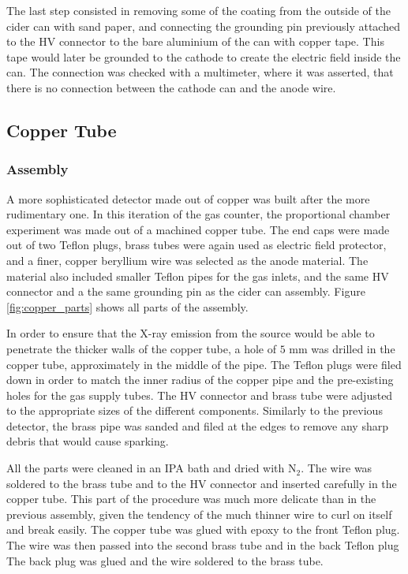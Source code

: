 The last step consisted in removing some of the coating from the outside of the cider can with sand paper, and connecting the grounding pin previously attached
to the HV connector to the bare aluminium of the can with copper tape. This tape would later be grounded to the cathode to create the electric field inside the can. The
connection was checked with a multimeter, where it was asserted, that there is no connection between the cathode can and the anode wire.

\subsection{Copper Tube}
\subsubsection{Assembly}
A more sophisticated detector made out of copper was built after the more rudimentary one. In this iteration of the gas counter, the proportional chamber experiment was made out of a machined copper tube. The end caps were made out of two Teflon plugs, brass tubes were again used as electric field protector, and a finer, copper beryllium wire was selected as the anode material. The material also included smaller Teflon pipes for the gas inlets, and the same HV connector and a the same grounding pin as the cider can assembly. Figure \ref{fig:copper_parts} shows all parts of the assembly.

In order to ensure that the X-ray emission from the source would be able to penetrate the thicker walls of the copper tube, a hole of $5$ mm was drilled in the copper tube, approximately in the middle of the pipe. The Teflon plugs were filed down in order to match the inner radius of the copper pipe and the pre-existing holes for the gas supply tubes. The HV connector and brass tube were adjusted to the appropriate sizes of the different components. Similarly to the previous detector, the brass pipe was sanded and filed at the edges to remove any sharp debris that would cause sparking.

All the parts were cleaned in an IPA bath and dried with N$_2$. The wire was soldered to the brass tube and to the HV connector and inserted carefully in the copper tube. This part of the procedure was much more delicate than in the previous assembly, given the tendency of the much thinner wire to curl on itself and break easily. The copper tube was glued with epoxy to the front Teflon plug. The wire was then passed into the second brass tube and in the back Teflon plug  The back plug was glued and the wire soldered to the brass tube.

